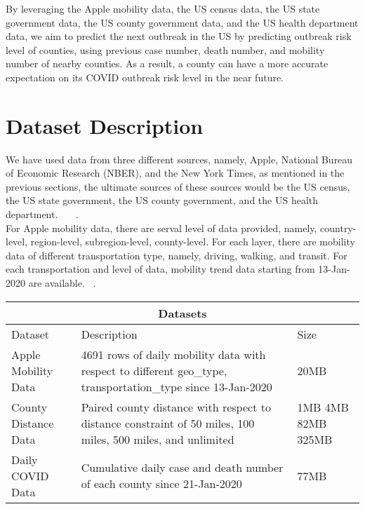 By leveraging the Apple mobility data, the US census data, the US state government data, the US county government data, and the US health department data, we aim to predict the next outbreak in the US by predicting outbreak risk level of counties, using previous case number, death number, and mobility number of nearby counties. As a result, a county can have a more accurate expectation on its COVID outbreak risk level in the near future. 

\section{Dataset Description}
We have used data from three different sources, namely, Apple, National Bureau of Economic Research (NBER), and the New York Times, as mentioned in the previous sections, the ultimate sources of these sources would be the US census, the US state government, the US county government, and the US health department. ~\cite{applemobility}~\cite{nytimes}~\cite{nber}.\\

For Apple mobility data, there are serval level of data provided, namely, country-level, region-level, subregion-level, county-level. For each layer, there are mobility data of different transportation type, namely, driving, walking, and transit. For each transportation and level of data, mobility trend data starting from 13-Jan-2020 are available.  ~\cite{applemobility}.
\begin{tabular}{ |p{2cm}||p{4cm}|p{1cm}|  }
 \hline
 \multicolumn{3}{|c|}{Datasets} \\
 \hline
 Dataset    & Description & Size\\
 \hline
 Apple Mobility Data & 
    4691 rows of daily mobility data with respect to different geo\_type, transportation\_type since 13-Jan-2020
 & 20MB\\
 \hline
 County Distance Data &   
    Paired county distance with respect to distance constraint of 50 miles, 100 miles, 500 miles, and unlimited 
   & 
    1MB
    4MB
    82MB
    325MB 
 \\
 \hline
 Daily COVID Data  &
 Cumulative daily case and death number of each county since 21-Jan-2020
 & 77MB\\
 \hline
\end{tabular}\\

